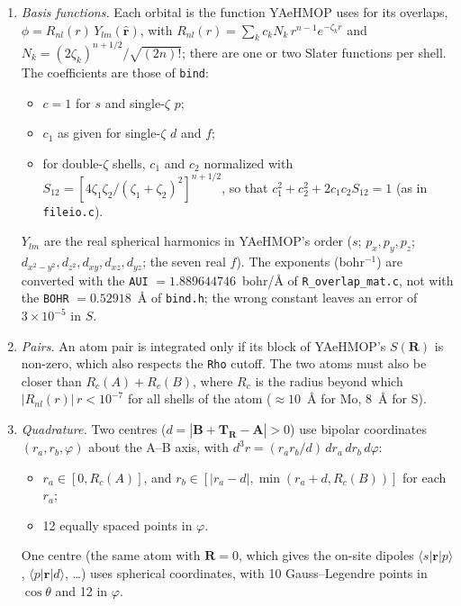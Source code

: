 \documentclass[11pt,a4paper]{article}
\newcommand{\file}[1]{\texttt{#1}}
\newcommand{\var}[1]{\texttt{#1}}
\begin{document}
\begin{enumerate}[leftmargin=*]
\item \emph{Basis functions.} Each orbital is the function YAeHMOP uses for its overlaps,
  $\phi=R_{nl}(r)\,Y_{lm}(\hat{\mathbf{r}})$, with
  $R_{nl}(r)=\sum_k c_k N_k\, r^{n-1}e^{-\zeta_k r}$ and
  $N_k=(2\zeta_k)^{n+1/2}/\sqrt{(2n)!}$; there are one or two Slater functions per shell.
  The coefficients are those of \texttt{bind}:
  \begin{itemize}
  \item $c=1$ for $s$ and single-$\zeta$ $p$;
  \item $c_1$ as given for single-$\zeta$ $d$ and $f$;
  \item for double-$\zeta$ shells, $c_1$ and $c_2$ normalized with
    $S_{12}=[4\zeta_1\zeta_2/(\zeta_1+\zeta_2)^2]^{n+1/2}$, so that
    $c_1^2+c_2^2+2c_1c_2S_{12}=1$ (as in \file{fileio.c}).
  \end{itemize}
  $Y_{lm}$ are the real spherical harmonics in YAeHMOP's order ($s$; $p_x,p_y,p_z$;
  $d_{x^2-y^2},d_{z^2},d_{xy},d_{xz},d_{yz}$; the seven real $f$). The exponents (bohr$^{-1}$)
  are converted with the \var{AUI} $=1.889644746$~bohr/\AA{} of \file{R\_overlap\_mat.c}, not
  with the \var{BOHR} $=0.52918$~\AA{} of \file{bind.h}; the wrong constant leaves an error of
  $3\times10^{-5}$ in $S$.
\item \emph{Pairs.} An atom pair is integrated only if its block of YAeHMOP's
  $S(\mathbf{R})$ is non-zero, which also respects the \texttt{Rho} cutoff. The two atoms
  must also be closer than $R_c(A)+R_c(B)$, where $R_c$ is the radius beyond which
  $|R_{nl}(r)|\,r<10^{-7}$ for all shells of the atom ($\approx10$~\AA{} for Mo, $8$~\AA{}
  for S).
\item \emph{Quadrature.} Two centres ($d=|\mathbf{B}+\mathbf{T}_\mathbf{R}-\mathbf{A}|>0$) use
  bipolar coordinates $(r_a,r_b,\varphi)$ about the A--B axis, with
  $d^3r = (r_a r_b/d)\,dr_a\,dr_b\,d\varphi$:
  \begin{itemize}
  \item $r_a\in[0,R_c(A)]$, and $r_b\in[|r_a-d|,\min(r_a+d,R_c(B))]$ for each $r_a$;
  \item 12 equally spaced points in $\varphi$.
  \end{itemize}
  One centre (the same atom with $\mathbf{R}=0$, which gives the on-site dipoles
  $\langle s|\mathbf{r}|p\rangle$, $\langle p|\mathbf{r}|d\rangle$, \ldots) uses spherical
  coordinates, with 10 Gauss--Legendre points in $\cos\theta$ and 12 in $\varphi$.
  \begin{itemize}

\end{itemize}
\end{enumerate}
\end{document}
